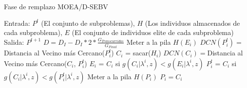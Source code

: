 \begin{algorithm}[H]
  \scriptsize
	\caption{Fase de remplazo MOEA/D-SEBV} 
	\begin{algorithmic}[1]
    	\STATE Entrada: $P^t$ (El conjunto de subproblemas), $H$ (Los individuos almacenados de cada subproblema), $E$ (El conjunto de individuos elite de cada subproblema)
    	\STATE Salida: $P^{t+1}$
		\STATE $D = D_I - D_I *2* \frac{G_{Transcurridas}}{G_{Final}}$ \label{DInicial}	\label{alg:modelo_decremento}
	 \label{alg:ini_for_remplazo}
	     \STATE Meter a la pila $H(E_i)$ \label{alg:insertar_elite}
	     \STATE $DCN(P_i^t) =  $ Distancia al Vecino más Cercano($P_i^t$) 
	    \label{alg:ini_while_remplazo_SEBV}
	      \STATE $C_i$ = sacar($H_i$) \label{alg:sacar_elemento}
	      \STATE $DCN(C_i) = $Distancia al Vecino más Cercano($C_i$, $P_i^t$) 
	      \STATE $E_i$ = $C_i$ si $g(C_i| \lambda^i, z) < g(E_i| \lambda^i, z)$  \label{alg:actualizar_elite}
	       \label{alg:ini_mejorar}
	         \STATE $P_i^t$ = $C_i$ si $g(C_i| \lambda^i, z) < g(P_i^t| \lambda^i, z)$ \label{alg:ini_mejorar2}
	       \label{alg:ini_aumentar_diversidad}
		 \STATE Meter a la pila $H( P_i  )$
		 \STATE $P_i = C_i$
		\ENDIF \label{alg:fin_aumentar_diversidad}
	      \ENDIF
	   \ENDWHILE \label{alg:fin_while_remplazo_SEBV}
	\ENDFOR \label{alg:fin_for_remplazo}
    \label{alg:Fase_Remplazo_SEBV}
\end{algorithmic}
\end{algorithm}



